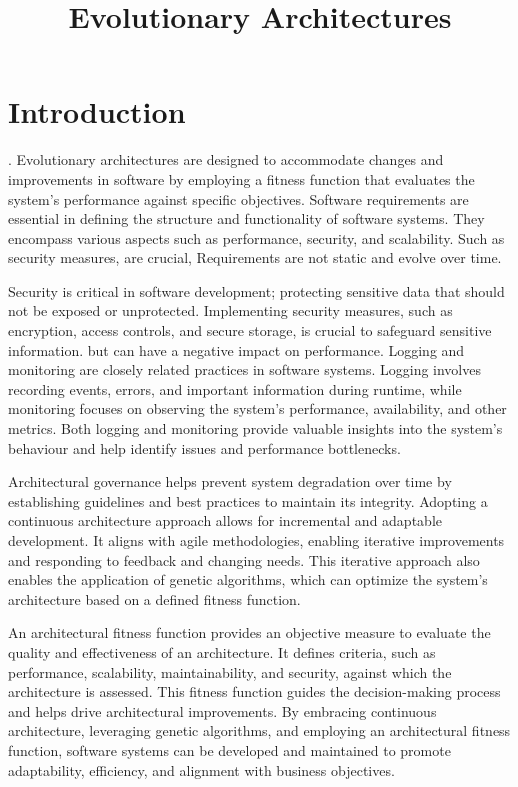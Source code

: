 \documentclass[main.tex]{subfiles}
\title{Evolutionary Architectures}
\begin{document}
\maketitle

\section{Introduction}
. 
Evolutionary architectures are designed to accommodate changes and improvements in software by employing a fitness function that evaluates the system's performance against specific objectives. Software requirements are essential in defining the structure and functionality of software systems. They encompass various aspects such as performance, security, and scalability.  Such as security measures, are crucial,  Requirements are not static and evolve over time. 


Security is critical in software development; protecting sensitive data that should not be exposed or unprotected. Implementing  security measures, such as encryption, access controls, and secure storage, is crucial to safeguard sensitive information.  but can have a negative impact on performance.  Logging and monitoring are closely related practices in software systems. Logging involves recording events, errors, and important information during runtime, while monitoring focuses on observing the system's performance, availability, and other metrics. Both logging and monitoring provide valuable insights into the system's behaviour and help identify issues and performance bottlenecks.

Architectural governance helps prevent system degradation over time by establishing guidelines and best practices to maintain its integrity.
Adopting a continuous architecture approach allows for incremental and adaptable development. It aligns with agile methodologies, enabling iterative improvements and responding to feedback and changing needs. This iterative approach also enables the application of genetic algorithms, which can optimize the system's architecture based on a defined fitness function.

An architectural fitness function provides an objective measure to evaluate the quality and effectiveness of an architecture. It defines criteria, such as performance, scalability, maintainability, and security, against which the architecture is assessed. This fitness function guides the decision-making process and helps drive architectural improvements. By embracing continuous architecture, leveraging genetic algorithms, and employing an architectural fitness function, software systems can be developed and maintained to promote adaptability, efficiency, and alignment with business objectives.
\end{document}
